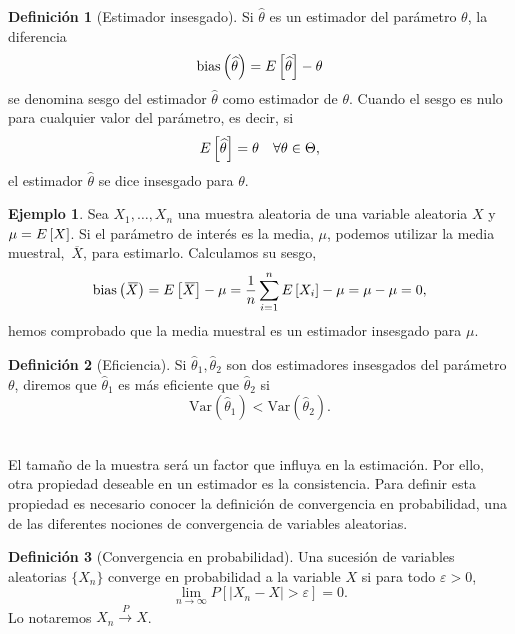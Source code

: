 \documentclass[12pt,a4paper]{report} %
\let\mathbb\relax
\newcommand{\bias}{\text{bias}}
\newcommand{\Var}{\text{Var}}
\newcommand{\olsi}[1]{\,\overline{\!{#1}}} %
\theoremstyle{definition}
\newtheorem{definition}{Definición}[section]
\newtheorem{example}[theorem]{Ejemplo}
\begin{document}
\begin{definition}[Estimador insesgado]
  Si $\widehat{\theta}$ es un estimador del parámetro $\theta$, la diferencia \[
\bias\left( \widehat{\theta}\right) = \mathbb{E}\left [\widehat{\theta} \right ] - \theta
\]
se denomina sesgo del estimador $\widehat{\theta}$ como estimador de $\theta$. Cuando el sesgo es nulo para cualquier valor del parámetro, es decir, si\[
\mathbb{E} \left [\widehat{\theta}\right] = \theta\quad \forall\theta \in\Theta,
\]
el estimador $\widehat{\theta}$ se dice insesgado para $\theta$.\\
\end{definition}

\begin{example}\label{ej:medest}
  Sea $X_1,\dots,X_n$ una muestra aleatoria de una variable aleatoria $X$ y $\mu = \E\left[X\right]$. Si el parámetro de interés es la media, $\mu$, podemos utilizar la media muestral, $\olsi{X}$, para estimarlo. Calculamos su sesgo,\[
\bias\left(\olsi{X} \right) = \E\left[ \olsi{X}\right] - \mu = \frac{1}{n} \sum_{i=1}^n\E \left [ X_i\right] - \mu = \mu - \mu = 0,
\]
hemos comprobado que la media muestral es un estimador insesgado para $\mu$.\\
\end{example}

\begin{definition}[Eficiencia]
  Si $\hat{\theta}_1, \hat{\theta}_2$ son dos estimadores insesgados del parámetro $\theta$, diremos que $\hat{\theta}_1$ es más eficiente que $\hat{\theta}_2$ si \[
\Var\left(\hat{\theta}_1\right) < \Var\left(\hat{\theta}_2\right).
  \]\\[-10pt]
\end{definition}

El tamaño de la muestra será un factor que influya en la estimación. Por ello, otra propiedad deseable en un estimador es la consistencia. Para definir esta propiedad es necesario conocer la definición de convergencia en probabilidad, una de las diferentes nociones de convergencia de variables aleatorias.\\

\begin{definition}[Convergencia en probabilidad]
  Una sucesión de variables aleatorias $\{X_n\}$ converge en probabilidad a la variable $X$ si para todo $\varepsilon > 0$,\[
\lim_{n\to\infty}P\left[|X_n-X|>\varepsilon \right] = 0. 
  \] Lo notaremos $X_n\xrightarrow[]{P}X$.\\
\end{definition}
\end{document}
